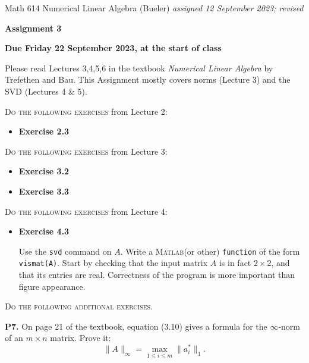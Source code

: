 \documentclass[12pt]{amsart}
\newcommand{\prob}[1]{\bigskip\noindent\textbf{#1.}\quad }
\newcommand{\Matlab}{\textsc{Matlab}\xspace}
\begin{document}
\scriptsize \noindent Math 614 Numerical Linear Algebra (Bueler) \hfill \emph{assigned 12 September 2023; revised}
\normalsize\medskip

\Large\centerline{\textbf{Assignment 3}}
\large
\medskip

\centerline{\textbf{Due Friday 22 September 2023, at the start of class}}
\medskip
\normalsize

\thispagestyle{empty}

\bigskip
\noindent Please read Lectures 3,4,5,6 in the textbook \emph{Numerical Linear Algebra} by Trefethen and Bau.  This Assignment mostly covers norms (Lecture 3) and the SVD (Lectures 4 \& 5).

\bigskip
\noindent \textsc{Do the following exercises} from Lecture 2:

\begin{itemize}
\item \textbf{Exercise 2.3}
\end{itemize}

\bigskip
\noindent \textsc{Do the following exercises} from Lecture 3:

\begin{itemize}
\item \textbf{Exercise 3.2}
\item \textbf{Exercise 3.3}
\end{itemize}

\bigskip
\noindent \textsc{Do the following exercises} from Lecture 4:

\begin{itemize}
\item \textbf{Exercise 4.3}  \qquad \begin{minipage}[t]{0.68\textwidth}
Use the \texttt{svd} command on $A$.  Write a \Matlab (or other) \texttt{function} of the form \texttt{vismat(A)}.  Start by checking that the input matrix $A$ is in fact $2\times 2$, and that its entries are real.  Correctness of the program is more important than figure appearance.
\end{minipage}
\end{itemize}


\bigskip
\noindent \textsc{Do the following additional exercises.}

\prob{P7}  On page 21 of the textbook, equation (3.10) gives a formula for the $\infty$-norm of an $m\times n$ matrix.  Prove it:
    $$\|A\|_\infty = \max_{1\le i \le m} \|a_i^*\|_1.$$
\end{document}
